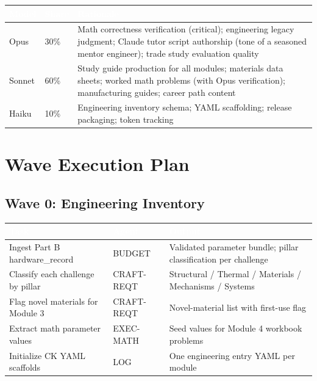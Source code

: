 \documentclass[11pt,letterpaper]{article}
\newcommand{\tableheader}[1]{\textbf{\sffamily\textcolor{white}{#1}}}
\begin{document}
\begin{center}
\begin{tabularx}{\textwidth}{L{2cm}C{1.5cm}X}
\toprule
{}
\tableheader{Model} & \tableheader{Share} & \tableheader{Rationale} \\
\midrule
Opus & 30\% & Math correctness verification (critical); engineering legacy judgment; Claude tutor script authorship (tone of a seasoned mentor engineer); trade study evaluation quality \\
Sonnet & 60\% & Study guide production for all modules; materials data sheets; worked math problems (with Opus verification); manufacturing guides; career path content \\
Haiku & 10\% & Engineering inventory schema; YAML scaffolding; release packaging; token tracking \\
\bottomrule
\end{tabularx}
\end{center}

\section{Wave Execution Plan}

\subsection{Wave 0: Engineering Inventory}

\begin{center}
\begin{tabularx}{\textwidth}{L{4cm}C{2cm}X}
\toprule
{}
\tableheader{Task} & \tableheader{Agent} & \tableheader{Output} \\
\midrule
Ingest Part B hardware\_record & BUDGET & Validated parameter bundle; pillar classification per challenge \\
Classify each challenge by pillar & CRAFT-REQT & Structural / Thermal / Materials / Mechanisms / Systems \\
Flag novel materials for Module 3 & CRAFT-REQT & Novel-material list with first-use flag \\
Extract math parameter values & EXEC-MATH & Seed values for Module 4 workbook problems \\
Initialize CK YAML scaffolds & LOG & One engineering entry YAML per module \\
\bottomrule
\end{tabularx}
\end{center}
\end{document}
